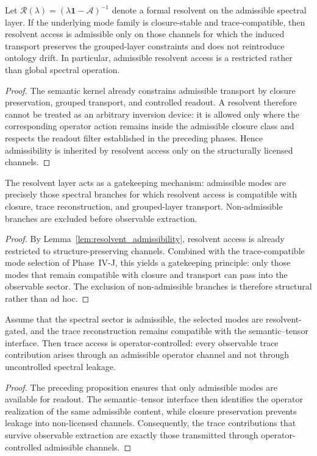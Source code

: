 \begin{lemma}\label{lem:resolvent_admissibility}
Let $\mathcal R(\lambda)=(\lambda\mathbf 1-\mathcal A)^{-1}$ denote a formal resolvent on the admissible spectral layer. If the underlying mode family is closure-stable and trace-compatible, then resolvent access is admissible only on those channels for which the induced transport preserves the grouped-layer constraints and does not reintroduce ontology drift. In particular, admissible resolvent access is a restricted rather than global spectral operation.
\end{lemma}
\begin{proof}
The semantic kernel already constrains admissible transport by closure preservation, grouped transport, and controlled readout. A resolvent therefore cannot be treated as an arbitrary inversion device: it is allowed only where the corresponding operator action remains inside the admissible closure class and respects the readout filter established in the preceding phases. Hence admissibility is inherited by resolvent access only on the structurally licensed channels.
\end{proof}

\begin{proposition}\label{prop:resolvent_gatekeeping}
The resolvent layer acts as a gatekeeping mechanism: admissible modes are precisely those spectral branches for which resolvent access is compatible with closure, trace reconstruction, and grouped-layer transport. Non-admissible branches are excluded before observable extraction.
\end{proposition}
\begin{proof}
By Lemma~\ref{lem:resolvent_admissibility}, resolvent access is already restricted to structure-preserving channels. Combined with the trace-compatible mode selection of Phase~IV-J, this yields a gatekeeping principle: only those modes that remain compatible with closure and transport can pass into the observable sector. The exclusion of non-admissible branches is therefore structural rather than ad hoc.
\end{proof}

\begin{theorem}\label{thm:operator_controlled_trace_access}
Assume that the spectral sector is admissible, the selected modes are resolvent-gated, and the trace reconstruction remains compatible with the semantic--tensor interface. Then trace access is operator-controlled: every observable trace contribution arises through an admissible operator channel and not through uncontrolled spectral leakage.
\end{theorem}
\begin{proof}
The preceding proposition ensures that only admissible modes are available for readout. The semantic--tensor interface then identifies the operator realization of the same admissible content, while closure preservation prevents leakage into non-licensed channels. Consequently, the trace contributions that survive observable extraction are exactly those transmitted through operator-controlled admissible channels.
\end{proof}

